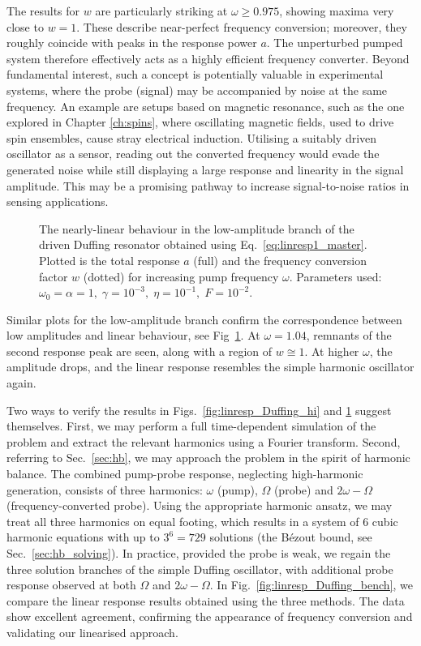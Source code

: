 The results for $w$ are particularly striking at $\omega \geq 0.975$, showing maxima very close to $w = 1$. These describe near-perfect frequency conversion; moreover, they roughly coincide with peaks in the response power $a$. The unperturbed pumped system therefore effectively acts as a highly efficient frequency converter. Beyond fundamental interest, such a concept is potentially valuable in experimental systems, where the probe (signal) may be accompanied by noise at the same frequency. An example are setups based on magnetic resonance, such as the one explored in Chapter \ref{ch:spins}, where oscillating magnetic fields, used to drive spin ensembles, cause stray electrical induction. Utilising a suitably driven oscillator as a sensor, reading out the converted frequency would evade the generated noise while still displaying  a large response and linearity in the signal amplitude. This may be a promising pathway to increase signal-to-noise ratios in sensing applications.

\begin{figure} [h!] 
	\centering
	
	\caption{The nearly-linear behaviour in the low-amplitude branch of the driven Duffing resonator obtained using Eq.~\eqref{eq:linresp1_master}. Plotted is the total response $a$ (full) and the frequency conversion factor $w$ (dotted) for increasing pump frequency $\omega$. Parameters used: $\omega_0 = \alpha = 1, \; \gamma = 10^{-3} , \; \eta = 10^{-1},\; F = 10^{-2}$.}
	\label{fig:linresp_Duffing_lo} 
\end{figure}

Similar plots for the low-amplitude branch confirm the correspondence between low amplitudes and linear behaviour, see Fig~\ref{fig:linresp_Duffing_lo}. At $\omega = 1.04$, remnants of the second response peak are seen, along with a region of $w \cong 1$. At higher $\omega$, the amplitude drops, and the linear response resembles the simple harmonic oscillator again.

Two ways to verify the results in Figs.~\ref{fig:linresp_Duffing_hi} and \ref{fig:linresp_Duffing_lo} suggest themselves. First, we may perform a full time-dependent simulation of the problem and extract the relevant harmonics using a Fourier transform. Second, referring to Sec.~\ref{sec:hb}, we may approach the problem in the spirit of harmonic balance. The combined pump-probe response, neglecting high-harmonic generation, consists of three harmonics: $\omega$ (pump), $\Omega$ (probe) and  $2\omega -\Omega$ (frequency-converted probe). Using the appropriate harmonic ansatz, we may treat all three harmonics on equal footing, which results in a system of 6 cubic harmonic equations with up to $3^6 = 729$ solutions (the B\'{e}zout bound, see Sec.~\ref{sec:hb_solving}). In practice, provided the probe is weak, we regain the three solution branches of the simple Duffing oscillator, with additional probe response observed at both $\Omega$ and $2 \omega - \Omega$.
In Fig.~\ref{fig:linresp_Duffing_bench}, we compare the linear response results obtained using the three methods. The data show excellent agreement, confirming the appearance of frequency conversion and validating our linearised approach. 

